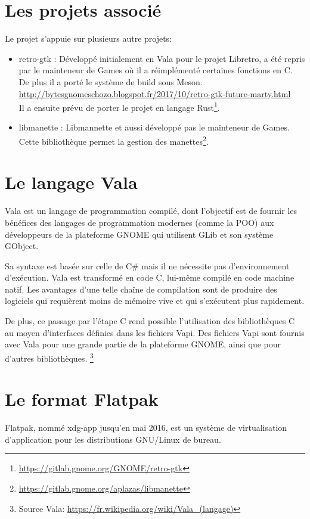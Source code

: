 \documentclass[12pt]{report}
\begin{document}
\section{Les projets associé}
Le projet s'appuie sur plusieurs autre projets:
\begin{itemize}
\item retro-gtk : Développé initialement en Vala pour le projet Libretro, a
  été repris par le mainteneur de Games où il a réimplémenté certaines
  fonctions en C. De plus il a porté le système de build sous Meson.\\
  \url{http://bytesgnomeschozo.blogspot.fr/2017/10/retro-gtk-future-marty.html}\\
  Il a ensuite prévu de porter le projet en langage Rust\footnote{\url{https://gitlab.gnome.org/GNOME/retro-gtk}}.
\item libmanette : Libmannette et aussi développé pas le mainteneur de Games. Cette bibliothèque
  permet la gestion des manettes\footnote{\url{https://gitlab.gnome.org/aplazas/libmanette}}.
\end{itemize}

\section{Le langage Vala}
Vala est un langage de programmation compilé, dont l'objectif est de
fournir les bénéfices des langages de programmation modernes (comme la
POO) aux développeurs de la plateforme GNOME qui utilisent GLib et son
système GObject.

Sa syntaxe est basée sur celle de C\# mais il ne nécessite pas
d'environnement d'exécution. Vala est transformé en code C, lui-même
compilé en code machine natif. Les avantages d'une telle chaîne de
compilation sont de produire des logiciels qui requièrent moins de
mémoire vive et qui s'exécutent plus rapidement.

De plus, ce passage par l'étape C rend possible l'utilisation des
bibliothèques C au moyen d'interfaces définies dans les fichiers
Vapi. Des fichiers Vapi sont fournis avec Vala pour une grande partie
de la plateforme GNOME, ainsi que pour d'autres bibliothèques.
\footnote{Source Vala: \url{https://fr.wikipedia.org/wiki/Vala_(langage)}}

\section{Le format Flatpak}
Flatpak, nommé xdg-app jusqu’en mai 2016, est un système de
virtualisation d’application pour les distributions GNU/Linux de
bureau.
\end{document}
